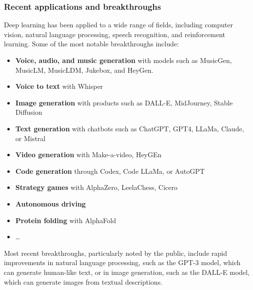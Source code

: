 \subsubsection{Recent applications and breakthroughs}
Deep learning has been applied to a wide range of fields, including computer vision, natural language processing, speech recognition, and reinforcement learning. Some of the most notable breakthroughs include:
\begin{itemize}
    \item \textbf{Voice, audio, and music generation} with models such as MusicGen, MusicLM, MusicLDM, Jukebox, and HeyGen.
    \item \textbf{Voice to text} with Whisper
    \item \textbf{Image generation} with products such as DALL-E, MidJourney, Stable Diffusion
    \item \textbf{Text generation} with chatbots such as ChatGPT, GPT4, LLaMa, Claude, or Mistral
    \item \textbf{Video generation} with Make-a-video, HeyGEn
    \item \textbf{Code generation} through Codex, Code LLaMa, or AutoGPT
    \item \textbf{Strategy games} with AlphaZero, LeelaChess, Cicero
    \item \textbf{Autonomous driving}
    \item \textbf{Protein folding} with AlphaFold
    \item \ldots  
\end{itemize}

Most recent breakthroughs, particularly noted by the public, include rapid improvements in natural language processing, such as the GPT-3 model, which can generate human-like text, or in image generation, such as the DALL-E model, which can generate images from textual descriptions.

